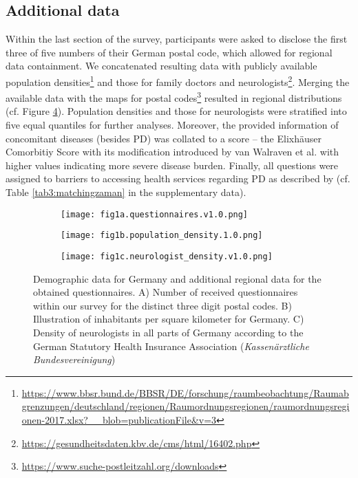 \documentclass[a4paper,oneside,11pt,english]{scrartcl}
\begin{document}
\subsection*{Additional data}
Within the last section of the survey, participants were asked to disclose the first three of five numbers of their German postal code, which allowed for regional data containment. We concatenated resulting data with publicly available population densities\footnote{\url{https://www.bbsr.bund.de/BBSR/DE/forschung/raumbeobachtung/Raumabgrenzungen/deutschland/regionen/Raumordnungsregionen/raumordnungsregionen-2017.xlsx?\_\_blob=publicationFile\&v=3}} and those for family doctors and neurologists\footnote{\url{https://gesundheitsdaten.kbv.de/cms/html/16402.php}}. Merging the available data with the maps for postal codes\footnote{\url{https://www.suche-postleitzahl.org/downloads}} resulted in regional distributions  (cf. Figure \ref{fig1:total}). Population densities and those for neurologists were stratified into five equal quantiles for further analyses. Moreover, the provided information of concomitant diseases (besides \textsc{PD}) was collated to a score -- the Elixhäuser Comorbitiy Score with its modification introduced by van Walraven et al. \cite{van2009modification} with higher values indicating more severe disease burden. Finally, all questions were assigned to barriers to accessing health services regarding \textsc{PD} as described by \cite{zaman2021barriers} (cf. Table \ref{tab3:matchingzaman} in the supplementary data).

\begin{figure}[h!]
\centering
\begin{subfigure}[b]{0.35\linewidth}
\texttt{[image: fig1a.questionnaires.v1.0.png]}
\label{fig1:questionnaires}
\end{subfigure}%
\begin{subfigure}[b]{0.35\linewidth}
\texttt{[image: fig1b.population\_density.1.0.png]}
\label{fig1:population}
\end{subfigure}%
\begin{subfigure}[b]{0.35\linewidth}
\texttt{[image: fig1c.neurologist\_density.v1.0.png]}
\label{fig1:neurologists}
\end{subfigure}%
\caption{Demographic data for Germany and additional regional data for the obtained questionnaires. A) Number of received questionnaires within our survey for the distinct three digit postal codes. B) Illustration of inhabitants per square kilometer for Germany. C) Density of neurologists in all parts of Germany according to the German Statutory Health Insurance Association (\textit{Kassenärztliche Bundesvereinigung})}
\label{fig1:total}
\end{figure}
\end{document}
